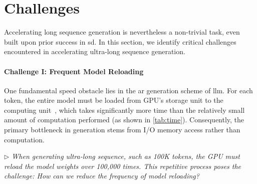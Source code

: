 \section{Challenges}
\label{sec:challenge}
Accelerating long sequence generation is nevertheless a non-trivial task, even built upon prior success in \acf{sd}.  In this section, we identify critical challenges encountered in accelerating ultra-long sequence generation.

\paragraph{Challenge I: Frequent Model Reloading}
\label{sec:reload}
One fundamental speed obstacle lies in the \ac{ar} generation scheme of \ac{llm}.
For each token, the entire model must be loaded from GPU's storage unit to the computing unit~\citep{llm_viewer}, which takes significantly more time than the relatively small amount of computation performed (as shown in \cref{tab:time}). Consequently, the primary bottleneck in generation stems from I/O memory access rather than computation.





% 


\textit{$\rhd$ When generating  ultra-long sequence, such as 100K tokens, the GPU must reload the model weights over 100,000 times. This repetitive process poses the challenge: How can we reduce the frequency of model reloading?}


